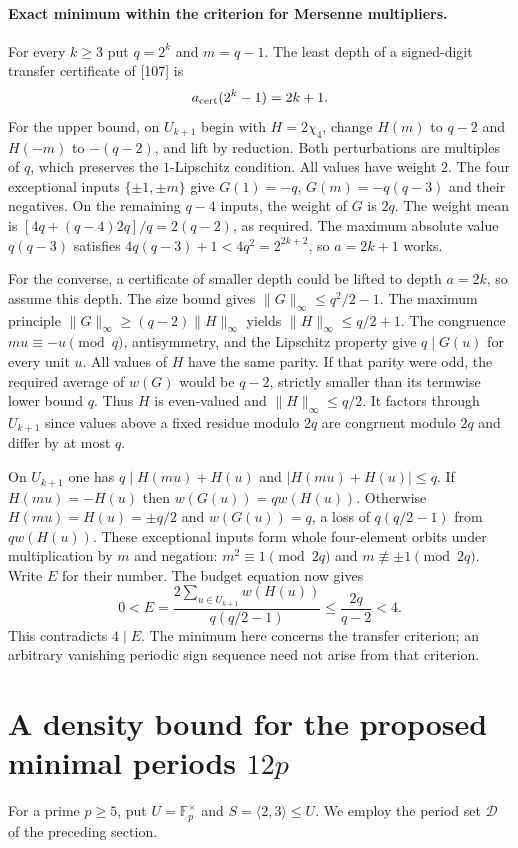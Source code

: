 \documentclass[11pt]{article}
\begin{document}
\paragraph{Exact minimum within the criterion for Mersenne multipliers.}
For every $k\ge3$ put $q=2^k$ and $m=q-1$.
The least depth of a signed-digit transfer certificate of [107] is
\[
 a_{\rm cert}(2^k-1)=2k+1 .
\]
For the upper bound, on $U_{k+1}$ begin with $H=2\chi_4$, change
$H(m)$ to $q-2$ and $H(-m)$ to $-(q-2)$, and lift by reduction.
Both perturbations are multiples of $q$, which preserves the
$1$-Lipschitz condition. All values have weight $2$.
The four exceptional inputs $\{\pm1,\pm m\}$ give
$G(1)=-q$, $G(m)=-q(q-3)$ and their negatives. On the remaining
$q-4$ inputs, the weight of $G$ is $2q$. The weight mean is
$[4q+(q-4)2q]/q=2(q-2)$, as required. The maximum absolute value
$q(q-3)$ satisfies $4q(q-3)+1<4q^2=2^{2k+2}$, so $a=2k+1$ works.

For the converse, a certificate of smaller depth could be
lifted to depth $a=2k$, so assume this depth. The size bound gives
$\|G\|_\infty\le q^2/2-1$. The maximum principle
$\|G\|_\infty\ge(q-2)\|H\|_\infty$ yields
$\|H\|_\infty\le q/2+1$. The congruence $mu\equiv-u\pmod q$,
antisymmetry, and the Lipschitz property give $q\mid G(u)$
for every unit $u$. All values of $H$ have the same parity.
If that parity were odd, the required average of $w(G)$ would be
$q-2$, strictly smaller than its termwise lower bound $q$.
Thus $H$ is even-valued and $\|H\|_\infty\le q/2$.
It factors through $U_{k+1}$ since values above a fixed residue
modulo $2q$ are congruent modulo $2q$ and differ by at most $q$.

On $U_{k+1}$ one has $q\mid H(mu)+H(u)$ and
$|H(mu)+H(u)|\le q$. If $H(mu)=-H(u)$ then $w(G(u))=q w(H(u))$.
Otherwise $H(mu)=H(u)=\pm q/2$ and $w(G(u))=q$,
a loss of $q(q/2-1)$ from $q w(H(u))$. These exceptional inputs form
whole four-element orbits under multiplication by $m$ and negation:
$m^2\equiv1\pmod{2q}$ and $m\not\equiv\pm1\pmod{2q}$.
Write $E$ for their number. The budget equation now gives
\[
 0<E=\frac{2\sum_{u\in U_{k+1}}w(H(u))}{q(q/2-1)}
 \le\frac{2q}{q-2}<4 .
\]
This contradicts $4\mid E$. The minimum here concerns the transfer
criterion; an arbitrary vanishing periodic sign sequence need not
arise from that criterion.



\section{A density bound for the proposed minimal periods \(12p\)}
For a prime $p\ge5$, put $U=\mathbb F_p^\times$ and
$S=\langle2,3\rangle\le U$. We employ the period set $\mathcal D$ of the
preceding section.
\end{document}
